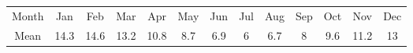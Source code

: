 \begin{tabular}{ccccccccccccc} \toprule
Month & Jan  & Feb  & Mar  & Apr  & May & Jun & Jul & Aug & Sep & Oct & Nov  & Dec \\
Mean  & 14.3 & 14.6 & 13.2 & 10.8 & 8.7 & 6.9 & 6   & 6.7 & 8   & 9.6 & 11.2 & 13  \\\bottomrule
\end{tabular}
